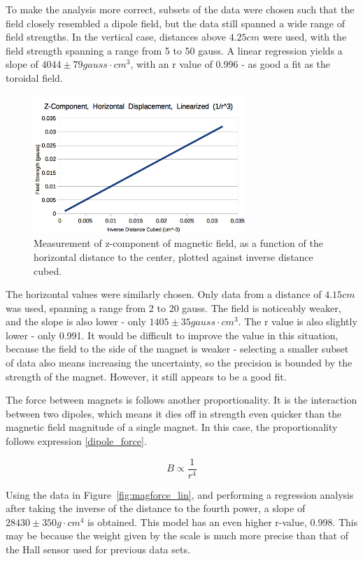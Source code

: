 \documentclass[journal]{IEEEtran}
\begin{document}
To make the analysis more correct, subsets of the data were chosen such that
the field closely resembled a dipole field, but the data still spanned a wide
range of field strengths. In the vertical case, distances above $4.25 cm$ were
used, with the field strength spanning a range from 5 to 50 gauss. A linear
regression yields a slope of $4044 \pm 79 gauss \cdot cm^3$, with an r value of 0.996
- as good a fit as the toroidal field.

\begin{figure}[ht!]
\centering
\includegraphics[width=80mm]{maghall_horiz_lin.png}
\caption{Measurement of z-component of magnetic field, as a function of the
horizontal distance to the center, plotted against inverse distance cubed.}
\label{fig:maghall_horiz_lin}
\end{figure}

The horizontal values were similarly chosen. Only data from a distance of $4.15
cm$ was used, spanning a range from 2 to 20 gauss. The field is noticeably
weaker, and the slope is also lower - only $1405 \pm 35 gauss \cdot cm^3$. The r
value is also slightly lower - only 0.991. It would be difficult to improve the
value in this situation, because the field to the side of the magnet is weaker
- selecting a smaller subset of data also means increasing the uncertainty, so
the precision is bounded by the strength of the magnet. However, it still
appears to be a good fit.

The force between magnets is follows another proportionality. It is the
interaction between two dipoles, which means it dies off in strength even
quicker than the magnetic field magnitude of a single magnet. In this case, the
proportionality follows expression \ref{dipole_force}.

\begin{equation}
\label{dipole_force}
B \propto \frac{1}{r^4}
\end{equation}

Using the data in Figure~\ref{fig:magforce_lin}, and performing a regression
analysis after taking the inverse of the distance to the fourth power, a slope
of $28430 \pm 350 g \cdot cm^4$ is obtained. This model has an even higher
r-value, 0.998. This may be because the weight given by the scale is much more
precise than that of the Hall sensor used for previous data sets.
\end{document}
